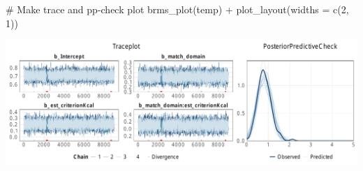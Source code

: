\documentclass[
  letterpaper,
  DIV=11,
  numbers=noendperiod]{scrartcl}
\newenvironment{Shaded}{\begin{snugshade}}{\end{snugshade}}
\newcommand{\AttributeTok}[1]{\textcolor[rgb]{0.40,0.45,0.13}{#1}}
\newcommand{\CommentTok}[1]{\textcolor[rgb]{0.37,0.37,0.37}{#1}}
\newcommand{\DecValTok}[1]{\textcolor[rgb]{0.68,0.00,0.00}{#1}}
\newcommand{\FunctionTok}[1]{\textcolor[rgb]{0.28,0.35,0.67}{#1}}
\newcommand{\NormalTok}[1]{\textcolor[rgb]{0.00,0.23,0.31}{#1}}
\newcommand{\SpecialCharTok}[1]{\textcolor[rgb]{0.37,0.37,0.37}{#1}}
\begin{document}
\begin{Shaded}
\begin{Highlighting}[]
\CommentTok{\# Make trace and pp{-}check plot}
\FunctionTok{brms\_plot}\NormalTok{(temp) }\SpecialCharTok{+} \FunctionTok{plot\_layout}\NormalTok{(}\AttributeTok{widths =} \FunctionTok{c}\NormalTok{(}\DecValTok{2}\NormalTok{, }\DecValTok{1}\NormalTok{))}
\end{Highlighting}
\end{Shaded}

\includegraphics{supplement_files/figure-pdf/h3bM2-1.pdf}
\end{document}
